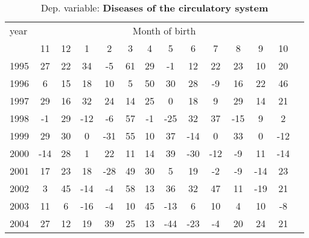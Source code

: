  \begin{table}[H] \begin{threeparttable} \centering \caption{Dep. variable: \textbf{Diseases of the circulatory system}} {\def\sym#1{\ifmmode^{#1}\else\(^{#1}\)\fi} \begin{tabular}{l*{13}{c}} \toprule year & \multicolumn{12}{c}{Month of birth} \\ \cmidrule(lr){2-13} 
            &          11&          12&           1&           2&           3&           4&           5&           6&           7&           8&           9&          10\\
1995        &          27&          22&          34&          -5&          61&          29&          -1&          12&          22&          23&          10&          20\\
1996        &           6&          15&          18&          10&           5&          50&          30&          28&          -9&          16&          22&          46\\
1997        &          29&          16&          32&          24&          14&          25&           0&          18&           9&          29&          14&          21\\
1998        &          -1&          29&         -12&          -6&          57&          -1&         -25&          32&          37&         -15&           9&           2\\
1999        &          29&          30&           0&         -31&          55&          10&          37&         -14&           0&          33&           0&         -12\\
2000        &         -14&          28&           1&          22&          11&          14&          39&         -30&         -12&          -9&          11&         -14\\
2001        &          17&          23&          18&         -28&          49&          30&           5&          19&          -2&          -9&         -14&          23\\
2002        &           3&          45&         -14&          -4&          58&          13&          36&          32&          47&          11&         -19&          21\\
2003        &          11&           6&         -16&          -4&          10&          45&         -13&           6&          10&           4&          10&          -8\\
2004        &          27&          12&          19&          39&          25&          13&         -44&         -23&          -4&          20&          24&          21\\

\end{tabular}}
\end{threeparttable}
\end{table}
